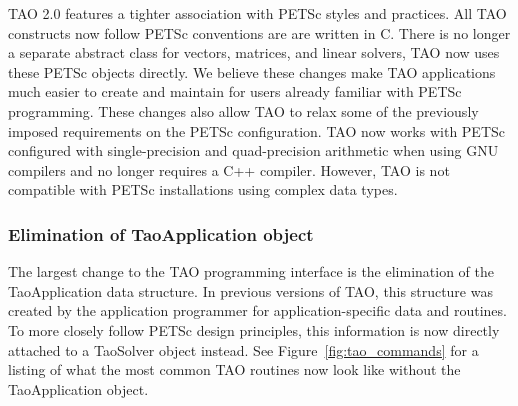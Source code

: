 TAO 2.0 features a tighter association with PETSc styles and practices.  All 
TAO constructs now follow PETSc conventions are are written in C.  There is 
no longer a separate abstract class for vectors, matrices, and linear 
solvers, TAO now uses these PETSc objects directly.  We believe these 
changes make TAO applications much easier to create and maintain for 
users already familiar with PETSc programming. These changes also allow 
TAO to relax some of the previously imposed requirements on the PETSc 
configuration.  TAO now works with PETSc configured with single-precision 
and quad-precision arithmetic when using GNU compilers and no longer 
requires a C++ compiler.  However, TAO is not compatible with PETSc 
installations using complex data types.

\subsubsection*{Elimination of TaoApplication object}

The largest change to the TAO programming interface is the elimination of the
TaoApplication data structure. In previous versions of TAO, this structure was 
created by the application programmer for application-specific data and 
routines.  To more closely follow PETSc design principles, this 
information is now directly attached to a TaoSolver object instead.  See 
Figure~\ref{fig:tao_commands} for a listing of what the most common TAO 
routines now look like without the TaoApplication object.

